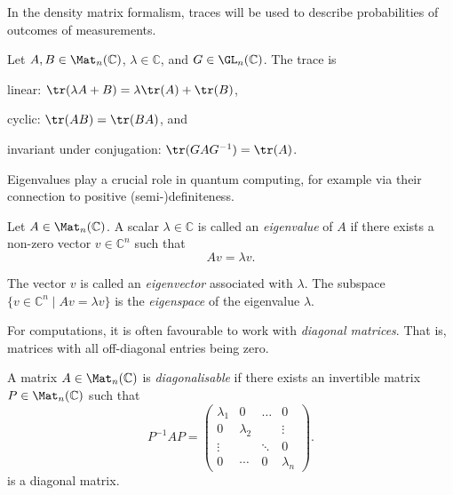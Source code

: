 \documentclass[a4paper,oneside, 12pt]{amsart}
\begin{document}
In the density matrix formalism, traces will be used to describe probabilities of outcomes of measurements.

\begin{proposition}\label{prop:basic-properties-of-trace}
  Let \(A, B\in \Mat_{n}( \mathbb{C})\), \(\lambda \in \mathbb{C}\), and \(G \in \GL_{n}( \mathbb{C})\).
  The trace  is
  \begin{thmlist}
    \item linear:  \(\tr(\lambda A + B) = \lambda \tr(A) + \tr(B)\),
    \item cyclic: \(\tr(AB) = \tr(BA)\), and
    \item invariant under conjugation: \(\tr(GAG^{-1}) = \tr(A)\).
  \end{thmlist}
\end{proposition}

Eigenvalues play a crucial role in quantum computing, for example via their connection to positive (semi-)definiteness.

\begin{definition}\label{def:eigenvalue-and-eigenspace}
  Let \( A \in \Mat_{n}(\mathbb{C}) \). A scalar \( \lambda \in \mathbb{C} \) is called an \emph{eigenvalue} of \( A \) if there exists a non-zero vector \( v \in \mathbb{C}^n \) such that
  \begin{equation}
    A v = \lambda v.
  \end{equation}

  The vector \( v \) is called an \emph{eigenvector} associated with \( \lambda \).
  The subspace \(\{v\in \mathbb{C}^{n} \mid Av = \lambda v\}\) is the \emph{eigenspace} of the eigenvalue \( \lambda \).
\end{definition}

For computations, it is often favourable to work with \emph{diagonal matrices}.
That is, matrices with all off-diagonal entries being zero.

\begin{definition}\label{def:diagonalisable}
  A matrix \( A \in \Mat_{n}(\mathbb{C}) \) is \emph{diagonalisable} if there exists an invertible matrix \( P \in \Mat_{n}(\mathbb{C}) \) such that
  \begin{equation*}
    P^{-1} A P =
    \begin{pmatrix}
      \lambda_1 & 0 & \dots & 0 \\
      0 & \lambda_2 & & \vdots \\
      \vdots & & \ddots & 0 \\
      0 & \cdots & 0 & \lambda_n
    \end{pmatrix}.
  \end{equation*}
  is a diagonal matrix.
\end{definition}
\end{document}

